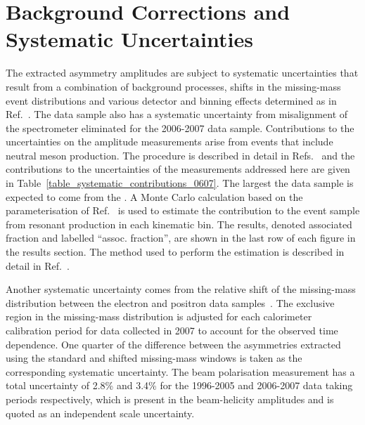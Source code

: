 \section{Background Corrections and Systematic Uncertainties}
The extracted asymmetry amplitudes are subject to systematic uncertainties that
result from a combination of background processes, 
shifts in the missing-mass event distributions and various detector and binning
effects determined as in Ref.~\cite{Air08,Air09}. The
 data sample also has a systematic uncertainty from misalignment of the spectrometer eliminated for the 2006-2007 data sample. Contributions to the uncertainties on the amplitude measurements arise from  events that include neutral meson production. The procedure is described in detail in Refs.~\cite{Air08,Air09} and the contributions to the uncertainties of the measurements addressed here are given in Table~\ref{table_systematic_contributions_0607}. The largest  the data sample is expected to come from the . A Monte Carlo calculation based on the parameterisation of Ref.~\cite{Bra76} is used to estimate the contribution to the event sample from resonant production in each kinematic bin. The results, denoted associated fraction and labelled ``assoc. fraction'', are shown in the last row of each figure in the results section. The method used to perform the estimation is described in detail in
Ref.~\cite{Air08}.

Another  systematic uncertainty comes from the relative shift of the
missing-mass distribution between the electron and positron data
samples~\cite{Zei09,Bur10}. The exclusive region in the missing-mass
distribution is adjusted for each calorimeter calibration period for data
collected in 2007 to account for the observed time dependence. One
quarter of the difference between the asymmetries extracted using the standard
and shifted missing-mass windows is taken as the corresponding systematic
uncertainty. The beam polarisation measurement has a total uncertainty of 2.8\% and 3.4\% for the 1996-2005 and 2006-2007 data taking periods respectively,
which is present in the beam-helicity amplitudes and is quoted as an
independent scale uncertainty.

